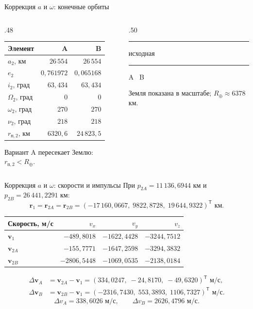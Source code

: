 \documentclass[11pt,aspectratio=169,t]{beamer}
\newcommand{\figurelegend}{%
 {\usebeamerfont{caption}\color{coursemuted}
 \textcolor{courseink}{\rule[.6ex]{5mm}{.5pt}} исходная\quad
 \textcolor{courseaccent}{\rule[.6ex]{5mm}{.6pt}} A\quad
 \textcolor{coursemuted}{\textendash\,\textendash} B\par}}
\begin{document}
\begin{frame}{Коррекция $a$ и $\omega$: конечные орбиты}
\begin{columns}[T,onlytextwidth]
\begin{column}{.48\textwidth}
\centering
\renewcommand{\arraystretch}{1.07}
\begin{tabular}{@{}lrr@{}}
\toprule
Элемент & A & B\\\midrule
$a_2$, км & $26\,554$ & $26\,554$\\
$e_2$ & $0{,}761972$ & $0{,}065168$\\
$i_2$, град & $63{,}434$ & $63{,}434$\\
$\Omega_2$, град & $0$ & $0$\\
$\omega_2$, град & $270$ & $270$\\
$\nu_2$, град & $218$ & $218$\\
$r_{\text{п},2}$, км & $6320{,}6$ & $24\,823{,}5$\\\bottomrule
\end{tabular}\par\medskip
\justifying
Вариант A пересекает Землю: $r_{\text{п},2}<R_\oplus$.
\end{column}
\begin{column}{.50\textwidth}
\centering\par\figurelegend
{\color{coursemuted}
Земля показана в масштабе; $R_\oplus\approx6378$ км.\par}
\end{column}
\end{columns}
\end{frame}

\begin{frame}{Коррекция $a$ и $\omega$: скорости и импульсы}
При $p_{2A}=11\,136{,}6944$ км и $p_{2B}=26\,441{,}2291$ км:
\[
\mathbf r_1=\mathbf r_{2A}=\mathbf r_{2B}
=(-17\,160{,}0667,\;9822{,}8728,\;19\,644{,}9322)^{\mathsf T}\text{ км}.
\]
\centering
\renewcommand{\arraystretch}{1.04}
\begin{tabular}{@{}lrrr@{}}
\toprule
Скорость, м/с & $v_x$ & $v_y$ & $v_z$\\\midrule
$\mathbf v_1$ & $-489{,}8018$ & $-1622{,}4428$ & $-3244{,}7512$\\
$\mathbf v_{2A}$ & $-155{,}7771$ & $-1647{,}2598$ & $-3294{,}3832$\\
$\mathbf v_{2B}$ & $-2806{,}5448$ & $-1069{,}0535$ & $-2138{,}0184$\\\bottomrule
\end{tabular}\par
\begin{align*}
\Delta\mathbf v_A&=\mathbf v_{2A}-\mathbf v_1
=(334{,}0247,\;-24{,}8170,\;-49{,}6320)^{\mathsf T}\text{ м/с},\\
\Delta\mathbf v_B&=\mathbf v_{2B}-\mathbf v_1
=(-2316{,}7430,\;553{,}3893,\;1106{,}7327)^{\mathsf T}\text{ м/с}.
\end{align*}
\[
\boxed{\Delta v_A=338{,}6026\text{ м/с}},\qquad
\boxed{\Delta v_B=2626{,}4796\text{ м/с}}.
\]
\end{frame}
\end{document}
